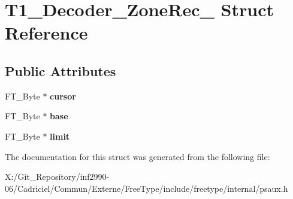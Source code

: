 \hypertarget{struct_t1___decoder___zone_rec__}{\section{T1\-\_\-\-Decoder\-\_\-\-Zone\-Rec\-\_\- Struct Reference}
\label{struct_t1___decoder___zone_rec__}
}
\subsection*{Public Attributes}
\begin{DoxyCompactItemize}
\item 
\hypertarget{struct_t1___decoder___zone_rec___a14e9f190496672f6174ead91e375767d}{F\-T\-\_\-\-Byte $\ast$ {\bfseries cursor}}\label{struct_t1___decoder___zone_rec___a14e9f190496672f6174ead91e375767d}

\item 
\hypertarget{struct_t1___decoder___zone_rec___a9cd7e54387b238504b1e8aae47b7da7c}{F\-T\-\_\-\-Byte $\ast$ {\bfseries base}}\label{struct_t1___decoder___zone_rec___a9cd7e54387b238504b1e8aae47b7da7c}

\item 
\hypertarget{struct_t1___decoder___zone_rec___a46fe1e4aa9bdb712ae414305f88d95db}{F\-T\-\_\-\-Byte $\ast$ {\bfseries limit}}\label{struct_t1___decoder___zone_rec___a46fe1e4aa9bdb712ae414305f88d95db}

\end{DoxyCompactItemize}


The documentation for this struct was generated from the following file\-:\begin{DoxyCompactItemize}
\item 
X\-:/\-Git\-\_\-\-Repository/inf2990-\/06/\-Cadriciel/\-Commun/\-Externe/\-Free\-Type/include/freetype/internal/psaux.\-h\end{DoxyCompactItemize}
